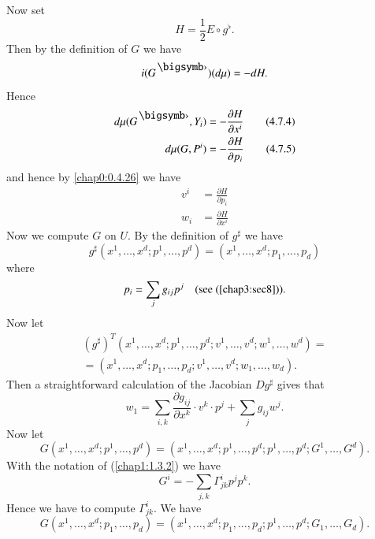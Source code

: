 Now set
\begin{equation*}
H=\frac{1}{2}E\circ g^{\flat}.\tag{4.7.3}\label{chap4:4.7.3}
\end{equation*}
Then by the definition of $G$ we have
$$
i(G^{\bigdot})(d\mu)=-dH.
$$
Hence\pageoriginale
\begin{align*}
d\mu(G^{\bigdot},Y_{i}) &=-\dfrac{\partial H}{\partial
  x^{i}}\tag{4.7.4}\label{chap4:4.7.4}\\
d\mu(G,P^{i}) &= -\dfrac{\partial H}{\partial p_{i}}\tag{4.7.5}\label{chap4:4.7.5} 
\end{align*}
and hence by \eqref{chap0:0.4.26} we have
\begin{align*}
v^{i} &= \frac{\partial H}{\partial p_{i}}\tag{4.7.6}\label{chap4:4.7.6}\\
w_{i} &= \frac{\partial H}{\partial x^{i}}\tag{4.7.7}\label{chap4:4.7.7}
\end{align*}
Now we compute $G$ on $U$. By the definition of $g^{\sharp}$ we have
\begin{equation*}
g^{\sharp}(x^{1},\ldots,x^{d};p^{1},\ldots,p^{d}) =
(x^{1},\ldots,x^{d};p_{1},\ldots,p_{d})\tag{4.7.8}\label{chap4:4.7.8}  
\end{equation*}
where
$$
p_{i}=\sum_{j}g_{ij}p^{j}\quad\text{(see (\ref{chap3:sec8}))}. 
$$
Now let
\begin{gather*}
(g^{\sharp})^{T}(x^{1},\ldots,x^{d};p^{1},\ldots,p^{d};v^{1},\ldots,v^{d};w^{1},\ldots,w^{d})=\tag{4.7.9}\label{chap4:4.7.9}\\
=(x^{1},\ldots,x^{d};p_{1},\ldots,p_{d};v^{1},\ldots,v^{d};w_{1},\ldots,w_{d}). 
\end{gather*}
Then a straightforward calculation of the Jacobian $Dg^{\sharp}$ gives
that
\begin{equation*}
w_{1}=\sum_{i,k}\frac{\partial g_{ij}}{\partial x^{k}}\cdot v^{k}\cdot p^{j}+\sum_{j}g_{ij}w^{j}.\tag{4.7.10}\label{chap4:4.7.10}
\end{equation*}
Now let
{\fontsize{9}{11}\selectfont
$$
G(x^{1},\ldots,x^{d};p^{1},\ldots,p^{d})=(x^{1},\ldots,x^{d};p^{1},\ldots,p^{d};p^{1},\ldots,p^{d};G^{1},\ldots,G^{d}).
$$}\relax
With the notation of (\eqref{chap1:1.3.2}) we have
\begin{equation*}
G^{i}=-\sum_{j,k}\Gamma^{i}_{jk}p^{j}p^{k}.\tag{4.7.11}\label{chap4:4.7.11}
\end{equation*}\pageoriginale
Hence we have to compute $\Gamma^{i}_{jk}$. We have
{\fontsize{9}{11}\selectfont
$$
G(x^{1},\ldots,x^{d};p_{1},\ldots,p_{d}) =
(x^{1},\ldots,x^{d};p_{1},\ldots,p_{d};p^{1}, \ldots,p^{d};
G_{1},\ldots,G_{d}).  
$$}\relax
